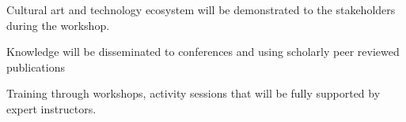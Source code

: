\item Cultural art and technology ecosystem will be demonstrated to the stakeholders during the workshop.
\item Knowledge will be disseminated to conferences and using scholarly peer reviewed publications
\item Training through workshops, activity sessions that will be fully supported by expert instructors.
